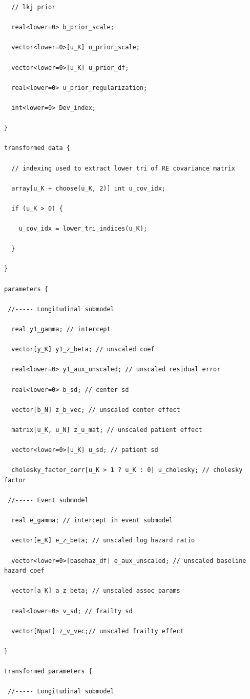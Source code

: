 \begin{SingleSpace}
\begin{verbatim}
  // lkj prior 
  
  real<lower=0> b_prior_scale;

  vector<lower=0>[u_K] u_prior_scale;

  vector<lower=0>[u_K] u_prior_df;

  real<lower=0> u_prior_regularization;

  int<lower=0> Dev_index;

}

transformed data {

  // indexing used to extract lower tri of RE covariance matrix

  array[u_K + choose(u_K, 2)] int u_cov_idx;

  if (u_K > 0) {

    u_cov_idx = lower_tri_indices(u_K);

  }

}

parameters {

 //----- Longitudinal submodel

  real y1_gamma; // intercept 

  vector[y_K] y1_z_beta; // unscaled coef

  real<lower=0> y1_aux_unscaled; // unscaled residual error 

  real<lower=0> b_sd; // center sd

  vector[b_N] z_b_vec; // unscaled center effect 

  matrix[u_K, u_N] z_u_mat; // unscaled patient effect  

  vector<lower=0>[u_K] u_sd; // patient sd  

  cholesky_factor_corr[u_K > 1 ? u_K : 0] u_cholesky; // cholesky factor 
 
 //----- Event submodel

  real e_gamma; // intercept in event submodel

  vector[e_K] e_z_beta; // unscaled log hazard ratio

  vector<lower=0>[basehaz_df] e_aux_unscaled; // unscaled baseline hazard coef

  vector[a_K] a_z_beta; // unscaled assoc params 

  real<lower=0> v_sd; // frailty sd

  vector[Npat] z_v_vec;// unscaled frailty effect

}

transformed parameters {

 //----- Longitudinal submodel
 

\end{verbatim}
\end{SingleSpace}
